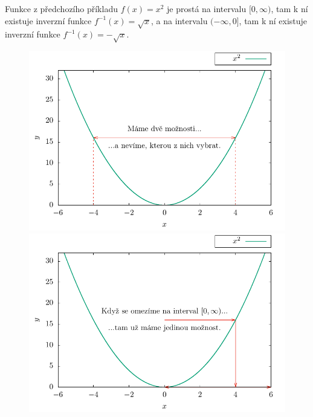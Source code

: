 \begin{example}
    Funkce z předchozího příkladu $f(x) = x^2$ je prostá na intervalu $[0,\infty)$, tam k ní existuje inverzní funkce $f^{-1}(x)=\sqrt{x}$, a na intervalu $(-\infty,0]$, tam k ní existuje inverzní funkce $f^{-1}(x)=-\sqrt{x}$.

    \begin{figure}[H]
        \centering
        \includegraphics[scale = 0.7]{Gnuplot/cv1/Figures/nejednoznacny.pdf}
        \includegraphics[scale = 0.7]{Gnuplot/cv1/Figures/nejednoznacny-reseni.pdf}
    \end{figure}

\end{example}

